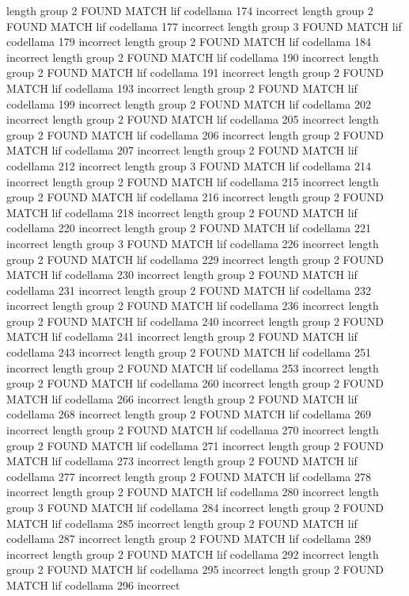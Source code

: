 length group  2
FOUND MATCH lif codellama 174 incorrect
length group  2
FOUND MATCH lif codellama 177 incorrect
length group  3
FOUND MATCH lif codellama 179 incorrect
length group  2
FOUND MATCH lif codellama 184 incorrect
length group  2
FOUND MATCH lif codellama 190 incorrect
length group  2
FOUND MATCH lif codellama 191 incorrect
length group  2
FOUND MATCH lif codellama 193 incorrect
length group  2
FOUND MATCH lif codellama 199 incorrect
length group  2
FOUND MATCH lif codellama 202 incorrect
length group  2
FOUND MATCH lif codellama 205 incorrect
length group  2
FOUND MATCH lif codellama 206 incorrect
length group  2
FOUND MATCH lif codellama 207 incorrect
length group  2
FOUND MATCH lif codellama 212 incorrect
length group  3
FOUND MATCH lif codellama 214 incorrect
length group  2
FOUND MATCH lif codellama 215 incorrect
length group  2
FOUND MATCH lif codellama 216 incorrect
length group  2
FOUND MATCH lif codellama 218 incorrect
length group  2
FOUND MATCH lif codellama 220 incorrect
length group  2
FOUND MATCH lif codellama 221 incorrect
length group  3
FOUND MATCH lif codellama 226 incorrect
length group  2
FOUND MATCH lif codellama 229 incorrect
length group  2
FOUND MATCH lif codellama 230 incorrect
length group  2
FOUND MATCH lif codellama 231 incorrect
length group  2
FOUND MATCH lif codellama 232 incorrect
length group  2
FOUND MATCH lif codellama 236 incorrect
length group  2
FOUND MATCH lif codellama 240 incorrect
length group  2
FOUND MATCH lif codellama 241 incorrect
length group  2
FOUND MATCH lif codellama 243 incorrect
length group  2
FOUND MATCH lif codellama 251 incorrect
length group  2
FOUND MATCH lif codellama 253 incorrect
length group  2
FOUND MATCH lif codellama 260 incorrect
length group  2
FOUND MATCH lif codellama 266 incorrect
length group  2
FOUND MATCH lif codellama 268 incorrect
length group  2
FOUND MATCH lif codellama 269 incorrect
length group  2
FOUND MATCH lif codellama 270 incorrect
length group  2
FOUND MATCH lif codellama 271 incorrect
length group  2
FOUND MATCH lif codellama 273 incorrect
length group  2
FOUND MATCH lif codellama 277 incorrect
length group  2
FOUND MATCH lif codellama 278 incorrect
length group  2
FOUND MATCH lif codellama 280 incorrect
length group  3
FOUND MATCH lif codellama 284 incorrect
length group  2
FOUND MATCH lif codellama 285 incorrect
length group  2
FOUND MATCH lif codellama 287 incorrect
length group  2
FOUND MATCH lif codellama 289 incorrect
length group  2
FOUND MATCH lif codellama 292 incorrect
length group  2
FOUND MATCH lif codellama 295 incorrect
length group  2
FOUND MATCH lif codellama 296 incorrect
